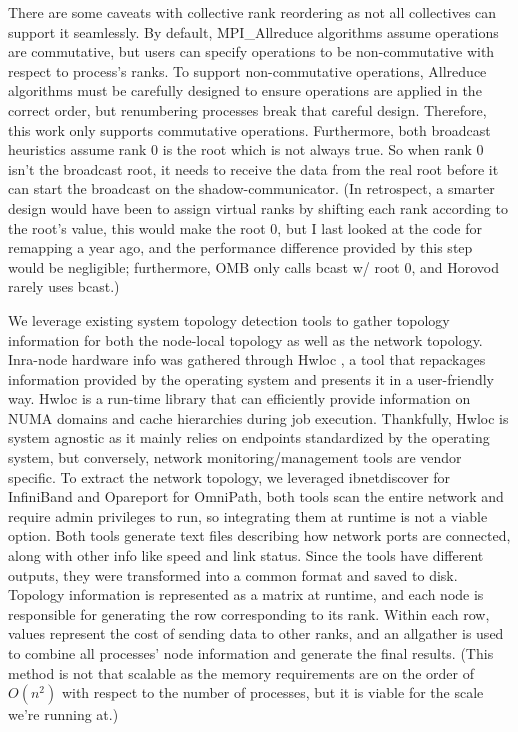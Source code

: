 There are some caveats with collective rank reordering as not all collectives can support it seamlessly.
By default, MPI\_Allreduce algorithms assume operations are commutative, but users can specify operations to be non-commutative with respect to process's ranks. 
To support non-commutative operations, Allreduce algorithms must be carefully designed to ensure operations are applied in the correct order, but renumbering processes break that careful design.
Therefore, this work only supports commutative operations.
Furthermore, both broadcast heuristics assume rank 0 is the root which is not always true. 
So when rank 0 isn't the broadcast root, it needs to receive the data from the real root before it can start the broadcast on the shadow-communicator.
(In retrospect, a smarter design would have been to assign virtual ranks by shifting each rank according to the root's value, this would make the root 0, but I last looked at the code for remapping a year ago, and the performance difference provided by this step would be negligible; furthermore, OMB only calls bcast w/ root 0, and Horovod rarely uses bcast.)

We leverage existing system topology detection tools to gather topology information for both the node-local topology as well as the network topology.
Inra-node hardware info was gathered through Hwloc \cite{Broquedis2010hwloc}, a tool that repackages information provided by the operating system and presents it in a user-friendly way.
Hwloc is a run-time library that can efficiently provide information on NUMA domains and cache hierarchies during job execution.
Thankfully, Hwloc is system agnostic as it mainly relies on endpoints standardized by the operating system, but conversely, network monitoring/management tools are vendor specific.
To extract the network topology, we leveraged ibnetdiscover for InfiniBand and Opareport for OmniPath, both tools scan the entire network and require admin privileges to run, so integrating them at runtime is not a viable option.
Both tools generate text files describing how network ports are connected, along with other info like speed and link status.
Since the tools have different outputs, they were transformed into a common format and saved to disk.
Topology information is represented as a matrix at runtime, and each node is responsible for generating the row corresponding to its rank.
Within each row, values represent the cost of sending data to other ranks, and an allgather is used to combine all processes' node information and generate the final results.
(This method is not that scalable as the memory requirements are on the order of $O(n^2)$ with respect to the number of processes, but it is viable for the scale we're running at.)

